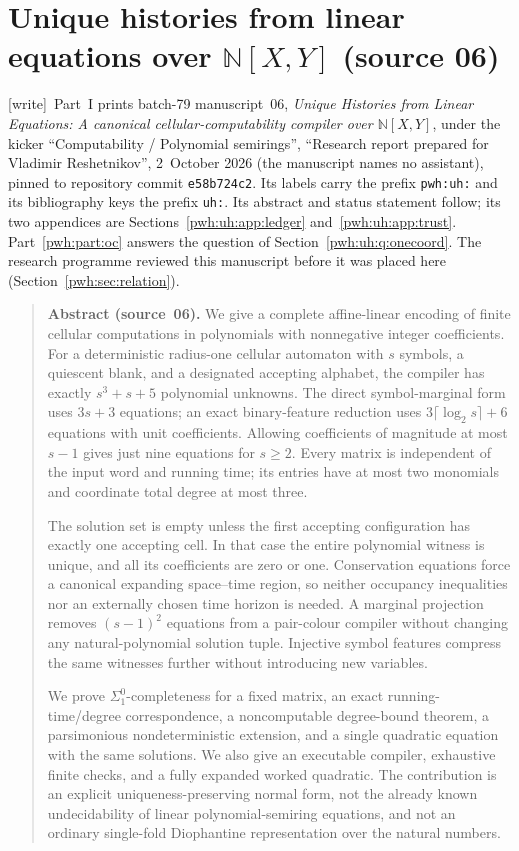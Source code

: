 \documentclass[11pt,letterpaper]{article}
\numberwithin{equation}{section}
\theoremstyle{definition}
\newcommand{\N}{\mathbb N}
\newcommand{\wtag}{\textup{[write]}}
\begin{document}
\part{Unique histories from linear equations over \texorpdfstring{$\N[X,Y]$}{N[X,Y]} (source 06)}\label{pwh:part:uh}

\noindent\wtag\ Part~I prints batch-79 manuscript~06, \emph{Unique
Histories from Linear Equations: A canonical cellular-computability
compiler over $\N[X,Y]$}, under the kicker ``Computability / Polynomial
semirings'', ``Research report prepared for Vladimir Reshetnikov'',
2~October 2026 (the manuscript names no assistant), pinned to repository
commit \texttt{e58b724c2}. Its labels carry the prefix \texttt{pwh:uh:}
and its bibliography keys the prefix \texttt{uh:}. Its abstract and status
statement follow; its two appendices are Sections~\ref{pwh:uh:app:ledger}
and~\ref{pwh:uh:app:trust}. Part~\ref{pwh:part:oc} answers the question of
Section~\ref{pwh:uh:q:onecoord}. The research programme reviewed this
manuscript before it was placed here~\cite{reviewUH}
(Section~\ref{pwh:sec:relation}).

\begin{quote}\small
\textbf{Abstract (source~06).}
We give a complete affine-linear encoding of finite cellular computations in
polynomials with nonnegative integer coefficients. For a deterministic
radius-one cellular automaton with $s$ symbols, a quiescent blank, and a
designated accepting alphabet, the compiler has exactly $s^3+s+5$ polynomial
unknowns. The direct symbol-marginal form uses $3s+3$ equations; an exact
binary-feature reduction uses $3\lceil\log_2s\rceil+6$ equations with unit
coefficients. Allowing coefficients of magnitude at most $s-1$ gives just
nine equations for $s\ge2$. Every matrix is independent of the input word
and running time; its entries have at most two monomials and coordinate
total degree at most three.

The solution set is empty unless the first accepting configuration has
exactly one accepting cell. In that case the entire polynomial witness is
unique, and all its coefficients are zero or one. Conservation equations
force a canonical expanding space--time region, so neither occupancy
inequalities nor an externally chosen time horizon is needed. A marginal
projection removes $(s-1)^2$ equations from a pair-colour compiler without
changing any natural-polynomial solution tuple. Injective symbol features
compress the same witnesses further without introducing new variables.

We prove $\Sigma^0_1$-completeness for a fixed matrix, an exact
running-time/degree correspondence, a noncomputable degree-bound theorem,
a parsimonious nondeterministic extension, and a single quadratic equation
with the same solutions. We also give an executable compiler, exhaustive
finite checks, and a fully expanded worked quadratic. The contribution is
an explicit uniqueness-preserving normal form, not the already known
undecidability of linear polynomial-semiring equations, and not an ordinary
single-fold Diophantine representation over the natural numbers.
\end{quote}
\end{document}
